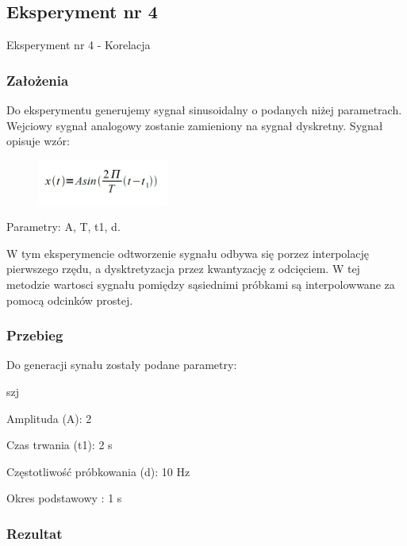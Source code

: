 \documentclass[12pt]{article}
\begin{document}
\subsection{Eksperyment nr 4}

Eksperyment nr 4 - Korelacja\\

\subsubsection{Założenia}
Do eksperymentu generujemy sygnał sinusoidalny o podanych niżej parametrach. Wejciowy sygnał analogowy zostanie zamieniony na sygnał dyskretny.
Sygnał opisuje wzór:

\begin{figure}[h!]
 \centering
 \includegraphics[width=4.3cm]{SinWzor.PNG}
 \vspace{-0.3cm}
 \label{gw}
\end{figure}
Parametry: A, T, t1, d.

W tym eksperymencie odtworzenie sygnału odbywa się porzez interpolację pierwszego rzędu, a dysktretyzacja przez kwantyzację z odcięciem. W tej metodzie wartosci sygnału pomiędzy sąsiednimi próbkami są interpolowwane za pomocą odcinków prostej.

\subsubsection{Przebieg}
Do generacji synału zostały podane parametry:

\begin{labeling}{szj}
\item [Amplituda (A):] 2
\item [Czas trwania (t1):] 2 s
\item [Częstotliwość próbkowania (d): ] 10 Hz
\item [Okres podstawowy :] 1 s
\end{labeling}

\subsubsection{Rezultat}
\end{document}
